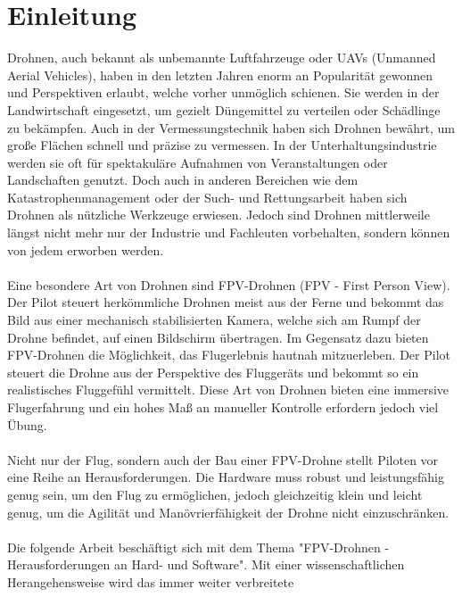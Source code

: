 
\section[Einleitung]{Einleitung}
    Drohnen, auch bekannt als unbemannte Luftfahrzeuge oder UAVs (Unmanned Aerial Vehicles),
    haben in den letzten Jahren enorm an Popularität gewonnen und Perspektiven erlaubt, welche
    vorher unmöglich schienen. Sie werden in der Landwirtschaft eingesetzt, um gezielt Düngemittel
    zu verteilen oder Schädlinge zu bekämpfen. Auch in der Vermessungstechnik haben sich Drohnen
    bewährt, um große Flächen schnell und präzise zu vermessen\cite{TheSkyistheLimit?}. In der Unterhaltungsindustrie werden
    sie oft für spektakuläre Aufnahmen von Veranstaltungen oder Landschaften genutzt. Doch
    auch in anderen Bereichen wie dem Katastrophenmanagement oder der Such- und Rettungsarbeit
    haben sich Drohnen als nützliche Werkzeuge erwiesen. Jedoch sind Drohnen mittlerweile
    längst nicht mehr nur der Industrie und Fachleuten vorbehalten, sondern können von jedem
    erworben werden.\\ 
    \\
    Eine besondere Art von Drohnen sind FPV-Drohnen (FPV - First Person View). Der Pilot
    steuert herkömmliche Drohnen meist aus der Ferne und bekommt das Bild aus einer mechanisch
    stabilisierten Kamera, welche sich am Rumpf der Drohne befindet, auf einen Bildschirm
    übertragen. Im Gegensatz dazu bieten FPV-Drohnen die Möglichkeit, das Flugerlebnis hautnah
    mitzuerleben. Der Pilot steuert die Drohne aus der Perspektive des Fluggeräts und bekommt
    so ein realistisches Fluggefühl vermittelt. Diese Art von Drohnen bieten eine immersive
    Flugerfahrung und ein hohes Maß an manueller Kontrolle erfordern jedoch viel Übung. \\
    \\
    Nicht nur der Flug, sondern auch der Bau einer FPV-Drohne stellt Piloten vor eine Reihe
    an Herausforderungen. Die Hardware muss robust und leistungsfähig genug sein, um den
    Flug zu ermöglichen, jedoch gleichzeitig klein und leicht genug, um die Agilität und
    Manövrierfähigkeit der Drohne nicht einzuschränken.\\
    \\
    Die folgende Arbeit beschäftigt sich mit dem Thema "FPV-Drohnen - Herausforderungen an Hard- und
    Software". Mit einer wissenschaftlichen Herangehensweise wird das immer weiter verbreitete
